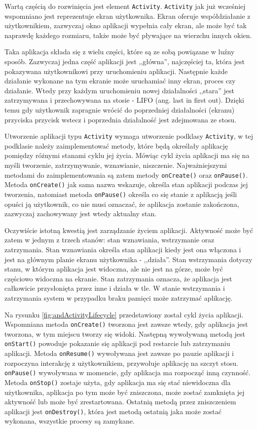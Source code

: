 \documentclass[eng,printmode,oneside]{mgr}
\begin{document}
Wartą częścią do rozwinięcia jest element \texttt{Activity}. \texttt{Activity}
jak już wcześniej wspomniano jest reprezentuje ekran użytkownika. Ekran oferuje
współdziałanie z użytkownikiem, zazwyczaj okno aplikacji wypełnia cały ekran,
ale może być tak naprawdę każdego rozmiaru, także może być pływające na wierzchu
innych okien. 

Taka aplikacja składa się z wielu części, które są ze sobą
powiązane w luźny sposób. Zazwyczaj jedna część aplikacji jest ,,główna'',
najczęściej ta, która jest pokazywana użytkownikowi przy uruchomieniu aplikacji.
Następnie każde działanie wykonane na tym ekranie może uruchamiać inny ekran,
proces czy działanie. Wtedy przy każdym uruchomieniu nowej działalności ,,stara''
jest zatrzymywana i przechowywana na stosie - LIFO (ang. last in first out).
Dzięki temu gdy użytkownik zapragnie wrócić do poprzedniej działalności (ekranu)
przyciska przycisk wstecz i poprzednia działalność jest zdejmowana ze stosu.

Utworzenie aplikacji typu \texttt{Activity} wymaga utworzenie podklasy
\texttt{Activity}, w tej podklasie należy zaimplementować metody, które będą
określały aplikację pomiędzy różnymi stanami cyklu jej życia. Mówiąc cykl życia
aplikacji ma się na myśli tworzenie, zatrzymywanie, wznawianie, niszczenie.
Najważniejszymi metodami do zaimplementowania są zatem metody
\texttt{onCreate()} oraz \texttt{onPause()}. Metoda \texttt{onCreate()} jak sama
nazwa wskazuje, określa stan aplikacji podczas jej tworzenia, natomiast metoda
\texttt{onPause()} określa co się stanie z aplikacją jeśli opuści ją użytkownik,
co nie musi oznaczać, że aplikacja zostanie zakończona, zazwyczaj zachowywany
jest wtedy aktualny stan.

Oczywiście istotną kwestią jest zarządzanie życiem aplikacji. Aktywność może być
zatem w jednym z trzech stanów: stan wznawiania, wstrzymanie oraz
zatrzymania. Stan wznawiania określa stan aplikacji kiedy jest ona włączona i
jest na głównym planie ekranu użytkownika - ,,działa''. Stan wstrzymania dotyczy
stanu, w którym aplikacja jest widoczna, ale nie jest na górze, może być
częściowo widoczna na ekranie. Stan zatrzymania oznacza, że aplikacja jest
całkowicie przysłonięta przez inne i działa w tle. W stanie wstrzymania i
zatrzymania system w przypadku braku pamięci może zatrzymać aplikację.

Na rysunku \ref{fig:andActivityLifecycle} przedstawiony został cykl życia
aplikacji. Wspomniana metoda \texttt{onCreate()} tworzona jest zawsze wtedy, gdy
aplikacja jest tworzona, w tym miejscu tworzy się widoki. Następną
wywoływaną metodą jest \texttt{onStart()} powoduje pokazanie się aplikacji pod
restarcie lub zatrzymaniu aplikacji. Metoda \texttt{onResume()} wywoływana jest
zawsze po pauzie aplikacji i rozpoczyna interakcję z użytkownikiem, przywołuje
aplikację na szczyt stosu. \texttt{onPause()} wywoływana w momencie, gdy
aplikacja ma rozpocząć inną czynność. Metoda \texttt{onStop()} zostaje użyta,
gdy aplikacja ma się stać niewidoczna dla użytkownika, aplikacja po tym może być
zniszczona, może zostać zamknięta jej aktywność lub może być zrestartowana.
Ostatnią metodą przez zniszczeniem aplikacji jest \texttt{onDestroy()}, która
jest metodą ostatnią jaka może zostać wykonana, wszystkie procesy są zamykane.
\end{document}
